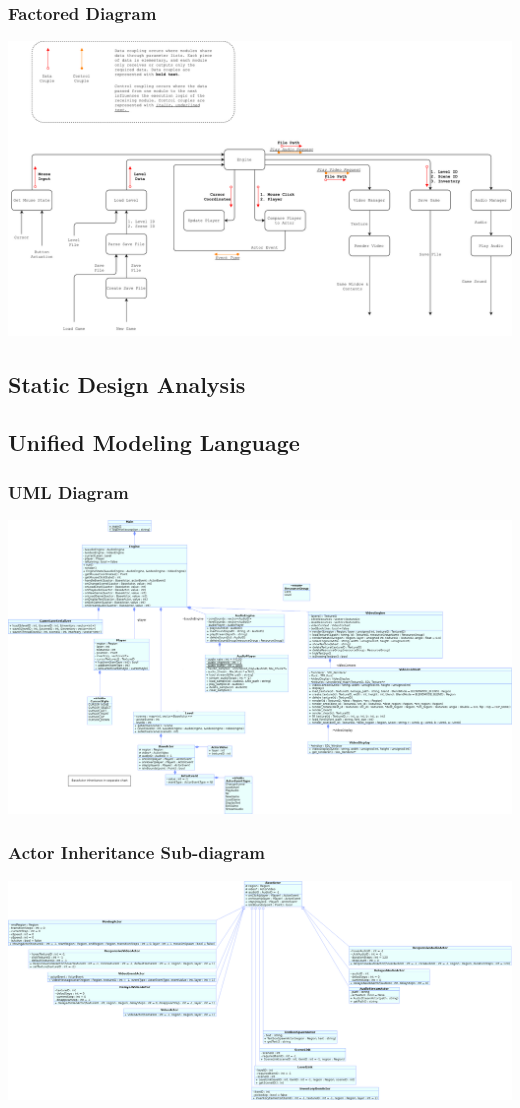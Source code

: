 \documentclass{article}
\begin{document}
		\subsubsection{Factored Diagram}
			\begin{center}
				\includegraphics[scale=0.35]{ddfFactored}
			\end{center}
	\subsection{Static Design Analysis}
	\subsection{Unified Modeling Language}
		\subsubsection{UML Diagram}
			\begin{center}
				\includegraphics[scale=0.30]{MainClasses}
			\end{center}
		\subsubsection{Actor Inheritance Sub-diagram}
			\begin{center}
				\includegraphics[scale=0.35]{Actors}
			\end{center}
		
\end{document}

